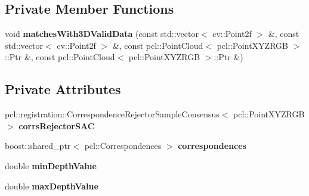 \subsection*{Private Member Functions}
\begin{DoxyCompactItemize}
\item 
\hypertarget{class_visual3_d_rigid_transformation_estimator___r_a_n_s_a_c_aaee81e09d6622e1a5a69f9f1c341884a}{
void {\bfseries matchesWith3DValidData} (const std::vector$<$ cv::Point2f $>$ \&, const std::vector$<$ cv::Point2f $>$ \&, const pcl::PointCloud$<$ pcl::PointXYZRGB $>$::Ptr \&, const pcl::PointCloud$<$ pcl::PointXYZRGB $>$::Ptr \&)}
\label{class_visual3_d_rigid_transformation_estimator___r_a_n_s_a_c_aaee81e09d6622e1a5a69f9f1c341884a}

\end{DoxyCompactItemize}
\subsection*{Private Attributes}
\begin{DoxyCompactItemize}
\item 
\hypertarget{class_visual3_d_rigid_transformation_estimator___r_a_n_s_a_c_a213b24bc3de5c061791cedd48e5343fa}{
pcl::registration::CorrespondenceRejectorSampleConsensus$<$ pcl::PointXYZRGB $>$ {\bfseries corrsRejectorSAC}}
\label{class_visual3_d_rigid_transformation_estimator___r_a_n_s_a_c_a213b24bc3de5c061791cedd48e5343fa}

\item 
\hypertarget{class_visual3_d_rigid_transformation_estimator___r_a_n_s_a_c_aac560055af9973e994c79debbc39ae72}{
boost::shared\_\-ptr$<$ pcl::Correspondences $>$ {\bfseries correspondences}}
\label{class_visual3_d_rigid_transformation_estimator___r_a_n_s_a_c_aac560055af9973e994c79debbc39ae72}

\item 
\hypertarget{class_visual3_d_rigid_transformation_estimator___r_a_n_s_a_c_aed18e1b68f2b6cf19fc81af88b6fbe63}{
double {\bfseries minDepthValue}}
\label{class_visual3_d_rigid_transformation_estimator___r_a_n_s_a_c_aed18e1b68f2b6cf19fc81af88b6fbe63}

\item 
\hypertarget{class_visual3_d_rigid_transformation_estimator___r_a_n_s_a_c_afae1bb594a06159e76b9808d7d329655}{
double {\bfseries maxDepthValue}}
\label{class_visual3_d_rigid_transformation_estimator___r_a_n_s_a_c_afae1bb594a06159e76b9808d7d329655}

\end{DoxyCompactItemize}


